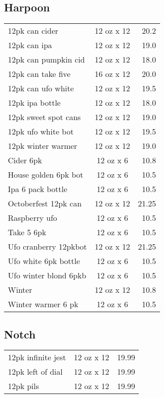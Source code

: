 \documentclass{article}%
\begin{document}
\begin{multicols}{3}
\subsection*{Harpoon}%
\begin{tabular}{>{\raggedright}p{16ex\hangindent=3ex} c r}%
12pk can cider&12 oz x 12&20.2\\%
12pk can ipa&12 oz x 12&19.0\\%
12pk can pumpkin cid&12 oz x 12&18.0\\%
12pk can take five&16 oz x 12&20.0\\%
12pk can ufo white&12 oz x 12&19.5\\%
12pk ipa bottle&12 oz x 12&18.0\\%
12pk sweet spot cans&12 oz x 12&19.0\\%
12pk ufo white bot&12 oz x 12&19.5\\%
12pk winter warmer&12 oz x 12&19.0\\%
Cider 6pk&12 oz x 6&10.8\\%
House golden 6pk bot&12 oz x 6&10.5\\%
Ipa 6 pack bottle&12 oz x 6&10.5\\%
Octoberfest 12pk can&12 oz x 12&21.25\\%
Raspberry ufo&12 oz x 6&10.5\\%
Take 5 6pk&12 oz x 6&10.5\\%
Ufo cranberry 12pkbot &12 oz x 12&21.25\\%
Ufo white 6pk bottle&12 oz x 6&10.5\\%
Ufo winter blond 6pkb&12 oz x 6&10.5\\%
Winter&12 oz x 12&10.8\\%
Winter warmer 6 pk&12 oz x 6&10.5\\%
\end{tabular}

%
\subsection*{Notch}%
\begin{tabular}{>{\raggedright}p{16ex\hangindent=3ex} c r}%
12pk infinite jest&12 oz x 12&19.99\\%
12pk left of dial&12 oz x 12&19.99\\%
12pk pils&12 oz x 12&19.99\\%
\end{tabular}

%

\end{multicols}
\end{document}

